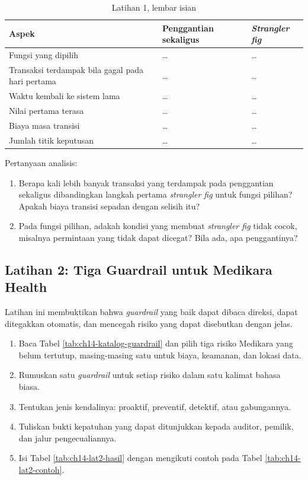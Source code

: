 \begin{table}[!htb]
  \centering
  \caption{Latihan 1, lembar isian}
  \label{tab:ch14-lat1-hasil}
  \footnotesize
  \begin{tabularx}{\textwidth}{>{\raggedright\arraybackslash}p{3.2cm}
      >{\raggedright\arraybackslash}X >{\raggedright\arraybackslash}X}
    \hline
    \textbf{Aspek} & \textbf{Penggantian sekaligus} & \textbf{\textit{Strangler fig}} \\ \hline
    Fungsi yang dipilih & \dots & \dots \\ \hline
    Transaksi terdampak bila gagal pada hari pertama & \dots & \dots \\ \hline
    Waktu kembali ke sistem lama & \dots & \dots \\ \hline
    Nilai pertama terasa & \dots & \dots \\ \hline
    Biaya masa transisi & \dots & \dots \\ \hline
    Jumlah titik keputusan & \dots & \dots \\ \hline
  \end{tabularx}
\end{table}

Pertanyaan analisis:
\begin{enumerate}
  \item Berapa kali lebih banyak transaksi yang terdampak pada penggantian sekaligus dibandingkan
        langkah pertama \textit{strangler fig} untuk fungsi pilihan? Apakah biaya transisi sepadan
        dengan selisih itu?
  \item Pada fungsi pilihan, adakah kondisi yang membuat \textit{strangler fig} tidak cocok,
        misalnya permintaan yang tidak dapat dicegat? Bila ada, apa penggantinya?
\end{enumerate}

\subsection*{Latihan 2: Tiga Guardrail untuk Medikara Health}

Latihan ini membuktikan bahwa \textit{guardrail} yang baik dapat dibaca direksi, dapat ditegakkan
otomatis, dan mencegah risiko yang dapat disebutkan dengan jelas.

\begin{enumerate}
  \item Baca Tabel \ref{tab:ch14-katalog-guardrail} dan pilih tiga risiko Medikara yang belum
        tertutup, masing-masing satu untuk biaya, keamanan, dan lokasi data.
  \item Rumuskan satu \textit{guardrail} untuk setiap risiko dalam satu kalimat bahasa biasa.
  \item Tentukan jenis kendalinya: proaktif, preventif, detektif, atau gabungannya.
  \item Tuliskan bukti kepatuhan yang dapat ditunjukkan kepada auditor, pemilik, dan jalur
        pengecualiannya.
  \item Isi Tabel \ref{tab:ch14-lat2-hasil} dengan mengikuti contoh pada Tabel
        \ref{tab:ch14-lat2-contoh}.
\end{enumerate}

